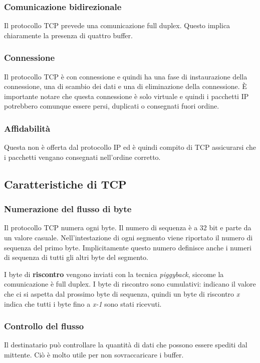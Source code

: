         \subsubsection{Comunicazione bidirezionale}
            Il protocollo TCP prevede una comunicazione full duplex. Questo implica chiaramente la presenza di quattro buffer.
            
        \subsubsection{Connessione}
            Il protocollo TCP è con connessione e quindi ha una fase di instaurazione della connessione, una di scambio dei dati e una di eliminazione della connessione. È importante notare che questa connessione è solo virtuale e quindi i pacchetti IP potrebbero comunque essere persi, duplicati o consegnati fuori ordine.
            
            
        \subsubsection{Affidabilità}
            Questa non è offerta dal protocollo IP ed è quindi compito di TCP assicurarsi che i pacchetti vengano consegnati nell'ordine corretto.
            
    \subsection{Caratteristiche di TCP}
        \subsubsection{Numerazione del flusso di byte}
            Il protocollo TCP numera ogni byte. Il numero di sequenza è a 32 bit e parte da un valore casuale. Nell'intestazione di ogni segmento viene riportato il numero di sequenza del primo byte. Implicitamente questo numero definisce anche i numeri di sequenza di tutti gli altri byte del segmento.
            
            I byte di \textbf{riscontro} vengono inviati con la tecnica \textit{piggyback}, siccome la comunicazione è full duplex. I byte di riscontro sono cumulativi: indicano il valore che ci si aspetta dal prossimo byte di sequenza, quindi un byte di riscontro \textit{x} indica che tutti i byte fino a \textit{x-1} sono stati ricevuti.
            
        \subsubsection{Controllo del flusso}
            Il destinatario può controllare la quantità di dati che possono essere spediti dal mittente. Ciò è molto utile per non sovraccaricare i buffer.
            
